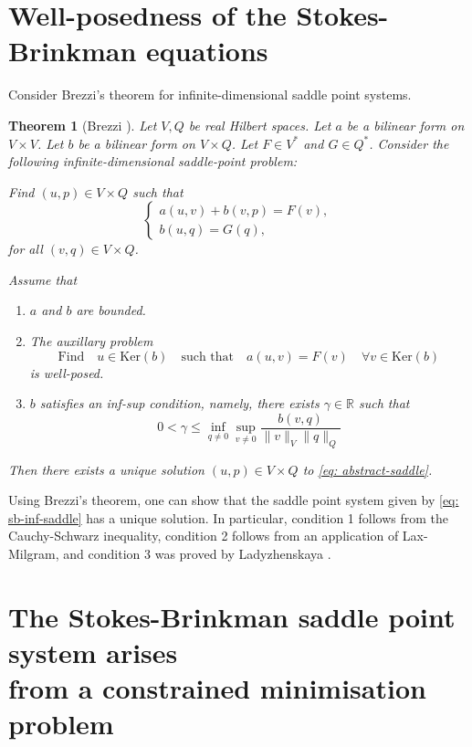 \documentclass[12pt]{article}
\theoremstyle{theorem}
\newtheorem{theorem}{Theorem}[section]
\begin{document}



\appendix
\section{Well-posedness of the Stokes-Brinkman equations}\label{app: brezzi}

Consider Brezzi's theorem for infinite-dimensional saddle point systems.

\begin{theorem}[Brezzi \cite{brezzi}]\label{theo: brezzi}
Let $V, Q$ be real Hilbert spaces. Let $a$ be a bilinear form on $V \times V$. Let $b$ be a bilinear form on $V \times Q$. Let $F \in V^*$ and $G \in Q^*$. Consider the following infinite-dimensional saddle-point problem:

Find $(u, p) \in V \times Q$ such that
\begin{equation}\label{eq: abstract-saddle}
    \begin{cases}
        a(u, v)+b(v,p) = F(v), \\
        b(u, q) = G(q),
    \end{cases}
\end{equation}
for all $(v, q) \in V \times Q$.

Assume that
\begin{enumerate}
    \item $a$ and $b$ are bounded.
    \item The auxillary problem
    $$
    \text{Find} \quad u \in \text{Ker}(b) \quad \text{such that} \quad a(u, v) = F(v) \quad \forall v \in \text{Ker}(b)
    $$
    is well-posed.
    \item $b$ satisfies an inf-sup condition, namely, there exists $\gamma \in \mathbb{R}$ such that
    $$
        0<\gamma \leq \inf_{q \neq 0} \sup_{v \neq 0} \frac{b(v, q)}{\lVert v\rVert_V \lVert q\rVert_Q}
    $$
\end{enumerate}
Then there exists a unique solution $(u, p) \in V \times Q$ to \eqref{eq: abstract-saddle}.
\end{theorem}

Using Brezzi's theorem, one can show that the saddle point system given by \eqref{eq: sb-inf-saddle} has a unique solution. In particular, condition 1 follows from the Cauchy-Schwarz inequality, condition 2 follows from an application of Lax-Milgram, and condition 3 was proved by Ladyzhenskaya \cite{ladyzhen}.

\section{The Stokes-Brinkman saddle point system arises \\from a constrained minimisation problem}\label{app: constrained-min}
\end{document}
